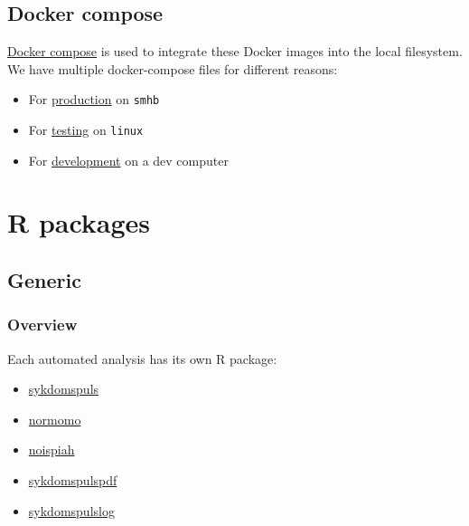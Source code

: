 \documentclass[12pt,]{article}
\providecommand{\tightlist}{%
  \setlength{\itemsep}{0pt}\setlength{\parskip}{0pt}}
\begin{document}
\subsection{Docker compose}\label{docker-compose}

\href{https://docs.docker.com/compose/}{Docker compose} is used to
integrate these Docker images into the local filesystem. We have
multiple docker-compose files for different reasons:

\begin{itemize}
\tightlist
\item
  For
  \href{https://github.com/raubreywhite/dashboards_control/blob/master/infrastructure/docker-compose-prod.yml}{production}
  on \texttt{smhb}
\item
  For
  \href{https://github.com/raubreywhite/dashboards_control/blob/master/infrastructure/docker-compose-test.yml}{testing}
  on \texttt{linux}
\item
  For
  \href{https://github.com/raubreywhite/dashboards_control/blob/master/infrastructure/docker-compose-dev.yml}{development}
  on a dev computer
\end{itemize}

\section{R packages}\label{r-packages}

\subsection{Generic}\label{generic}

\subsubsection{Overview}\label{overview}

Each automated analysis has its own R package:

\begin{itemize}
\tightlist
\item
  \href{https://folkehelseinstituttet.github.io/dashboards_sykdomspuls/}{sykdomspuls}
\item
  \href{https://folkehelseinstituttet.github.io/dashboards_normomo/}{normomo}
\item
  \href{https://folkehelseinstituttet.github.io/dashboards_noispiah/}{noispiah}
\item
  \href{https://folkehelseinstituttet.github.io/dashboards_sykdomspuls_pdf/}{sykdomspulspdf}
\item
  \href{https://folkehelseinstituttet.github.io/dashboards_sykdomspuls_log/}{sykdomspulslog}
\end{itemize}
\end{document}
